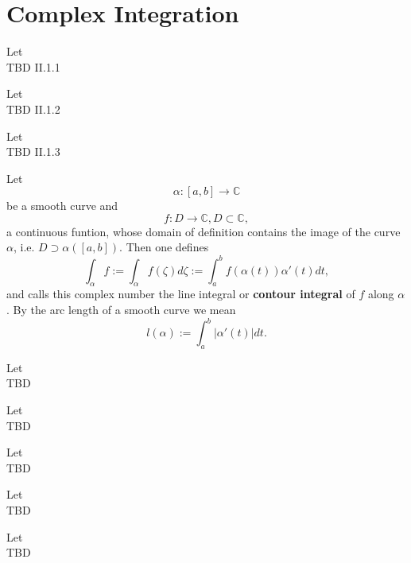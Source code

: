 \section{Complex Integration}


\begin{definition}[Curve]
    \label{sec:Curve}
    Let\\
    TBD II.1.1
\end{definition}


\begin{definition}
    \label{sec:SmoothCurve}
    Let\\
    TBD II.1.2
\end{definition}


\begin{definition}
    \label{sec:PiecewiseSmoothCurve}
    Let\\
    TBD II.1.3
\end{definition}


\begin{definition}
    \label{sec:ContourIntegral}
    Let
    $$\alpha : [a, b] \rightarrow \mathbb{C}$$
    be a smooth curve and
    $$f: D \rightarrow \mathbb{C}, D \subset \mathbb{C},$$
    a continuous funtion, whose domain of definition contains the image of the curve $\alpha$,
    i.e. $D \supset \alpha([a,b]).$ Then one defines
    $$ \int_\alpha f:= \int_\alpha f(\zeta) d\zeta := \int_a^b f(\alpha(t))\alpha'(t)dt,$$
    and calls this complex number the line integral or \textbf{contour integral} of $f$ along $\alpha$.
    By the arc length of a smooth curve we mean
    $$l(\alpha):=\int_a^b |\alpha'(t)|dt.$$
\end{definition}


\begin{definition}
    \label{sec:PropContourIntegral}
    Let\\
    TBD
\end{definition}


\begin{definition}
    \label{sec:ArcwiseConnected}
    Let\\
    TBD
\end{definition}


\begin{definition}[Domain (II.2.3)]
    \label{sec:Domain}
    Let\\
    TBD
\end{definition}


\begin{definition}
    \label{sec:StarDomain}
    Let\\
    TBD
\end{definition}


\begin{definition}
    \label{sec:ElemDomain}
    Let\\
    TBD
\end{definition}